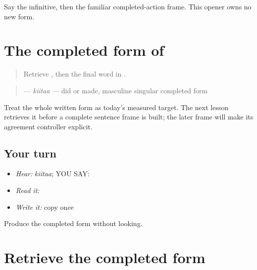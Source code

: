 \begin{tcolorbox}[breakable,colback=teal!4,colframe=teal!35!black,title={Before you move on}]
Say the infinitive, then the familiar completed-action frame. This opener owns no new form.
\end{tcolorbox}
\section[\texorpdfstring{\pa{ਕੀਤਾ} (kiitaa)}{ਕੀਤਾ (kiitaa)}]{The completed form of }

\label{lesson:PA-C190-kita}



\begin{quote}
Retrieve \textbf{}, then the final word in \textbf{   }.
\end{quote}

\begin{grammarlens}[title={Grammar Lens: direct owner}]
\begin{quote}
\textbf{} — \emph{kiitaa} — did or made, masculine singular completed form
\end{quote}

Treat the whole written form as today's measured target. The next lesson retrieves it before a complete sentence frame is built; the later frame will make its agreement controller explicit.
\end{grammarlens}

\subsection*{Your turn}
\begin{itemize}
\raggedright
  \item \emph{Hear:} \emph{kiitaa}; YOU SAY: \textbf{}
  \item \emph{Read it:} \textbf{}
  \item \emph{Write it:} copy \textbf{} once
\end{itemize}

\begin{tcolorbox}[breakable,colback=teal!4,colframe=teal!35!black,title={Before you move on}]
Produce the completed form without looking.
\end{tcolorbox}
\section[\texorpdfstring{\pa{ਕੀਤਾ} (kiitaa)}{ਕੀਤਾ (kiitaa)}]{Retrieve the completed form}

